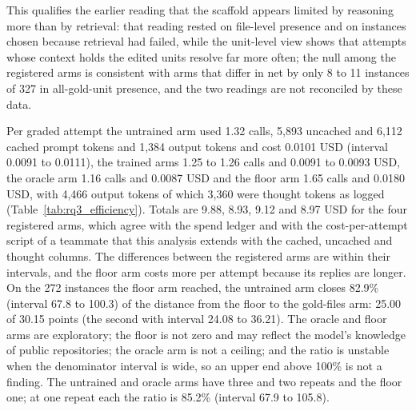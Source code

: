 \documentclass[10pt,twocolumn]{article}
\makeatletter
\renewcommand\paragraph{\@startsection{paragraph}{4}{\z@}{3pt}{-0.5em}{\normalfont\bfseries}}
\makeatother
\begin{document}
This qualifies the earlier reading that the scaffold appears limited by reasoning more than by retrieval: that reading rested on file-level presence and on instances chosen because retrieval had failed, while the unit-level view shows that attempts whose context holds the edited units resolve far more often; the null among the registered arms is consistent with arms that differ in net by only 8 to 11 instances of 327 in all-gold-unit presence, and the two readings are not reconciled by these data. %



\paragraph{Efficiency.} Per graded attempt the untrained arm used 1.32 calls, 5,893 uncached and 6,112 cached prompt tokens and 1,384 output tokens and cost 0.0101 USD (interval 0.0091 to 0.0111), the trained arms 1.25 to 1.26 calls and 0.0091 to 0.0093 USD, the oracle arm 1.16 calls and 0.0087 USD and the floor arm 1.65 calls and 0.0180 USD, with 4,466 output tokens of which 3,360 were thought tokens as logged (Table~\ref{tab:rq3_efficiency}). %
Totals are 9.88, 8.93, 9.12 and 8.97 USD for the four registered arms, which agree with the spend ledger and with the cost-per-attempt script of a teammate that this analysis extends with the cached, uncached and thought columns. %
The differences between the registered arms are within their intervals, and the floor arm costs more per attempt because its replies are longer. %
On the 272 instances the floor arm reached, the untrained arm closes 82.9\% (interval 67.8 to 100.3) of the distance from the floor to the gold-files arm: 25.00 of 30.15 points (the second with interval 24.08 to 36.21). %
The oracle and floor arms are exploratory; the floor is not zero and may reflect the model's knowledge of public repositories; the oracle arm is not a ceiling; and the ratio is unstable when the denominator interval is wide, so an upper end above 100\% is not a finding. The untrained and oracle arms have three and two repeats and the floor one; at one repeat each the ratio is 85.2\% (interval 67.9 to 105.8). %

\end{document}
